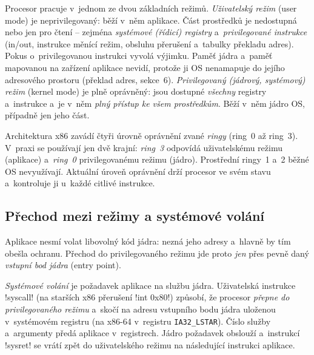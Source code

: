 \begin{definice}
Procesor pracuje v~jednom ze dvou základních režimů.
\emph{Uživatelský režim} (user mode) je neprivilegovaný: běží v~něm aplikace. Část prostředků je nedostupná nebo jen pro čtení -- zejména \emph{systémové (řídicí) registry} a~\emph{privilegované instrukce} (in/out, instrukce měnící režim, obsluhu přerušení a~tabulky překladu adres). Pokus o~privilegovanou instrukci vyvolá výjimku. Paměť jádra a~paměť mapovanou na zařízení aplikace nevidí, protože ji OS nenamapuje do jejího adresového prostoru (překlad adres, sekce~6).
\emph{Privilegovaný (jádrový, systémový) režim} (kernel mode) je plně oprávněný: jsou dostupné \emph{všechny} registry a~instrukce a~je v~něm \emph{plný přístup ke všem prostředkům}. Běží v~něm jádro OS, případně jen jeho část.
\end{definice}

\begin{poznamka}
Architektura x86 zavádí čtyři úrovně oprávnění zvané \emph{ringy} (ring~0 až ring~3). V~praxi se používají jen dvě krajní: \emph{ring~3} odpovídá uživatelskému režimu (aplikace) a~\emph{ring~0} privilegovanému režimu (jádro). Prostřední ringy~1 a~2 běžné OS nevyužívají. Aktuální úroveň oprávnění drží procesor ve svém stavu a~kontroluje ji u~každé citlivé instrukce.
\end{poznamka}

\subsection{Přechod mezi režimy a systémové volání}

Aplikace nesmí volat libovolný kód jádra: nezná jeho adresy a~hlavně by tím obešla ochranu. Přechod do privilegovaného režimu jde proto \emph{jen} přes pevně daný \emph{vstupní bod jádra} (entry point).

\begin{definice}
\emph{Systémové volání} je požadavek aplikace na službu jádra. Uživatelská instrukce \cd!syscall! (na starších x86 přerušení \cd!int 0x80!) způsobí, že procesor \emph{přepne do privilegovaného režimu} a~skočí na adresu vstupního bodu jádra uloženou v~systémovém registru (na x86-64 v~registru \texttt{IA32\_LSTAR}). Číslo služby a~argumenty předá aplikace v~registrech. Jádro požadavek obslouží a~instrukcí \cd!sysret! se vrátí zpět do uživatelského režimu na následující instrukci aplikace.
\end{definice}

